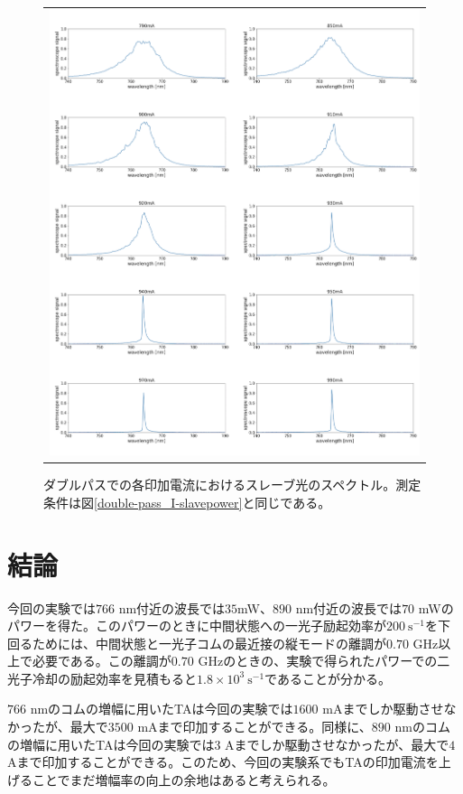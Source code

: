 \documentclass[uplatex, dvipdfmx, a4paper, report, papersize, 11pt]{jsbook}
\begin{document}
\begin{figure}[H]
\begin{tabular}{c}
      \begin{minipage}{1\hsize}
        \centering
          \includegraphics[keepaspectratio,  scale=0.340,  angle=0]
                          {figures/chapter4/double-pass-Slave-Spectrum.png}
                          \caption{ダブルパスでの各印加電流におけるスレーブ光のスペクトル。測定条件は図\ref{double-pass_I-slavepower}と同じである。}
                          \label{double-pass_I-Slave}

      \end{minipage}


    \end{tabular}
\end{figure}
\section{結論}

今回の実験では$766$ nm付近の波長では$35$mW、$890$ nm付近の波長では$70$ mWのパワーを得た。このパワーのときに中間状態への一光子励起効率が$200\ \mathrm{s^{-1}}$を下回るためには、中間状態と一光子コムの最近接の縦モードの離調が$0.70$ GHz以上で必要である。この離調が$0.70$ GHzのときの、実験で得られたパワーでの二光子冷却の励起効率を見積もると$1.8\times10^3\ \mathrm{s^{-1}}$であることが分かる。\par
$766$ nmのコムの増幅に用いたTAは今回の実験では$1600$ mAまでしか駆動させなかったが、最大で$3500$ mAまで印加することができる。同様に、$890$ nmのコムの増幅に用いたTAは今回の実験では$3$ Aまでしか駆動させなかったが、最大で$4$ Aまで印加することができる。このため、今回の実験系でもTAの印加電流を上げることでまだ増幅率の向上の余地はあると考えられる。\par




\end{document}
